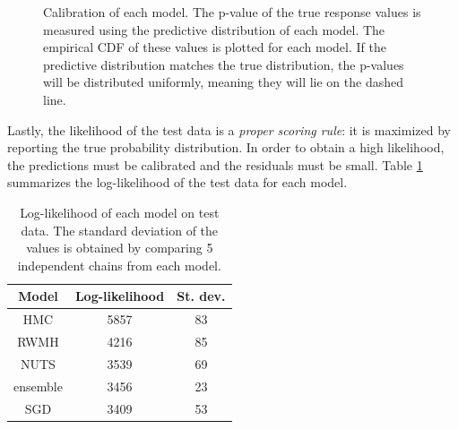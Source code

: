 \documentclass[12pt]{article}
\begin{document}
\begin{figure}[H]
\centering
{}
\caption{Calibration of each model. The p-value of the true response values is measured using the predictive distribution of each model. The empirical CDF of these values is plotted for each model. If the predictive distribution matches the true distribution, the p-values will be distributed uniformly, meaning they will lie on the dashed line.}
\label{fig_uci_residuals_pvals}
\end{figure}

Lastly, the likelihood of the test data is a \textit{proper scoring rule}: it is maximized by reporting the true probability distribution. In order to obtain a high likelihood, the predictions must be calibrated and the residuals must be small. Table \ref{table_uci_loglike} summarizes the log-likelihood of the test data for each model. %

\begin{table}[H]
\centering
\begin{tabular}{|c|c|c|}
\hline
Model    & Log-likelihood & St. dev. \\ \hline
HMC      & 5857           & 83       \\ \hline
RWMH     & 4216           & 85       \\ \hline
NUTS     & 3539           & 69       \\ \hline
ensemble & 3456           & 23       \\ \hline
SGD      & 3409           & 53       \\ \hline
\end{tabular}
\label{table_uci_loglike}
\caption{Log-likelihood of each model on test data. The standard deviation of the values is obtained by comparing 5 independent chains from each model.}
\end{table}
\end{document}
